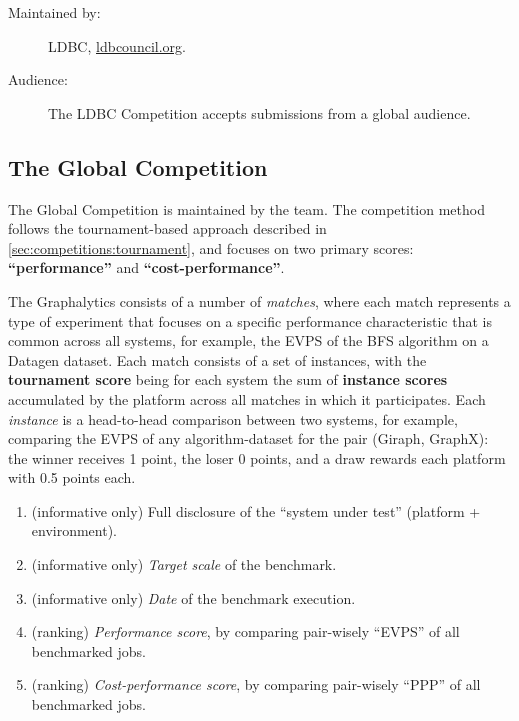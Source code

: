 \begin{description}
    \item[Maintained by:] LDBC, \url{ldbcouncil.org}.
    \item[Audience:] The LDBC Competition accepts submissions from a global audience.
\end{description} 




\subsection{The Global \toolname{} Competition} \label{sec:competitions:graphalytics}
The Global \toolname{} Competition is maintained by the \toolname team. The competition method follows the tournament-based approach described in \autoref{sec:competitions:tournament}, and focuses on two primary scores: {\bf ``performance''} and {\bf ``cost-performance''}.

The Graphalytics consists of a number of {\it matches}, where each match represents a type of experiment that focuses on a specific performance characteristic that is common across all systems, for example, the EVPS of the BFS algorithm on a Datagen dataset. Each match consists of a set of instances, with the {\bf tournament score} being for each system the sum of {\bf instance scores} accumulated by the platform across all matches in which it participates.  Each {\it instance} is a head-to-head comparison between two systems, for example, comparing the EVPS of any algorithm-dataset for the pair (Giraph, GraphX): the winner receives 1 point, the loser 0 points, and a draw rewards each platform with 0.5 points each.


\begin{enumerate}
    \item (informative only) Full disclosure of the ``system under test'' (platform + environment).
    \item (informative only) {\it Target scale} of the benchmark.
    \item (informative only) {\it Date} of the benchmark execution.
	\item (ranking) {\it Performance score}, by comparing pair-wisely ``EVPS'' of all benchmarked jobs.
	\item (ranking) {\it Cost-performance score}, by comparing pair-wisely  ``PPP'' of all benchmarked jobs.
\end{enumerate}


